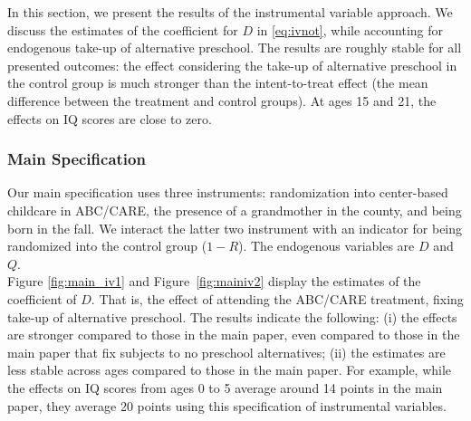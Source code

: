 \noindent In this section, we present the results of the instrumental variable approach. We discuss the estimates of the coefficient for $D$ in \eqref{eq:ivnot}, while accounting for endogenous take-up of alternative preschool. The results are roughly stable for all presented outcomes: the effect considering the take-up of alternative preschool in the control group is much stronger than the intent-to-treat effect (the mean difference between the treatment and control groups). At ages 15 and 21, the effects on IQ scores are close to zero.

\subsubsection{Main Specification}

\noindent Our main specification uses three instruments: randomization into center-based childcare in ABC/CARE, the presence of a grandmother in the county, and being born in the fall. We interact the latter two instrument with an indicator for being randomized into the control group ($1-R$). The endogenous variables are $D$ and $Q$.\\

\noindent Figure \ref{fig:main_iv1} and Figure~\ref{fig:mainiv2} display the estimates of the coefficient of $D$. That is, the effect of attending the ABC/CARE treatment, fixing take-up of alternative preschool. The results indicate the following: (i) the effects are stronger compared to those in the main paper, even compared to those in the main paper that fix subjects to no preschool alternatives; (ii) the estimates are less stable across ages compared to those in the main paper. For example, while the effects on IQ scores from ages 0 to 5 average around 14 points in the main paper, they average 20 points using this specification of instrumental variables.

